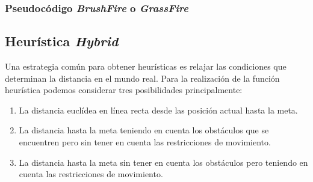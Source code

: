 \subsubsection{Pseudocódigo \textit{BrushFire} o \textit{GrassFire}} \label{brushfire}

\subsection{Heurística \textit{Hybrid \Astar}} \label{hueristicahybrid}
Una estrategia común para obtener heurísticas es relajar las condiciones que determinan la distancia en el mundo real. Para la realización de la función heurística podemos considerar tres posibilidades principalmente:

\begin{enumerate}
\item La distancia euclídea en línea recta desde las posición actual hasta la meta.
\item La distancia hasta la meta teniendo en cuenta los obstáculos que se encuentren pero sin tener en cuenta las restricciones de movimiento.
\item La distancia hasta la meta sin tener en cuenta los obstáculos pero teniendo en cuenta las restricciones de movimiento.
\end{enumerate}

